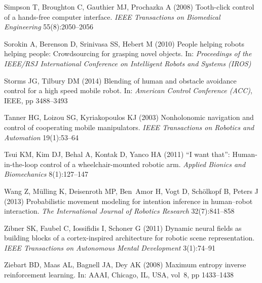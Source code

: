 \documentclass[natbib, twocolumn]{svjour3}          %
\begin{document}
\begin{thebibliography}{54}
	Simpson T, Broughton C, Gauthier MJ, Prochazka A (2008) Tooth-click control of
	a hands-free computer interface. \textit{IEEE Transactions on Biomedical
		Engineering} 55(8):2050--2056
	
	Sorokin A, Berenson D, Srinivasa SS, Hebert M (2010) People helping robots
	helping people: Crowdsourcing for grasping novel objects. In:
	\textit{Proceedings of the IEEE/RSJ International Conference on Intelligent
		Robots and Systems (IROS)}
	
	Storms JG, Tilbury DM (2014) Blending of human and obstacle avoidance control
	for a high speed mobile robot. In: \textit{American Control Conference
		(ACC)}, IEEE, pp 3488--3493
	
	Tanner HG, Loizou SG, Kyriakopoulos KJ (2003) Nonholonomic navigation and
	control of cooperating mobile manipulators. \textit{IEEE Transactions on
		Robotics and Automation} 19(1):53--64
	
	Tsui KM, Kim DJ, Behal A, Kontak D, Yanco HA (2011) “{I} want that”:
	Human-in-the-loop control of a wheelchair-mounted robotic arm.
	\textit{Applied Bionics and Biomechanics} 8(1):127--147
	
	Wang Z, M{\"u}lling K, Deisenroth MP, Ben~Amor H, Vogt D, Sch{\"o}lkopf B,
	Peters J (2013) Probabilistic movement modeling for intention inference in
	human--robot interaction. \textit{The International Journal of Robotics
		Research} 32(7):841--858
	
	Zibner SK, Faubel C, Iossifidis I, Schoner G (2011) Dynamic neural fields as
	building blocks of a cortex-inspired architecture for robotic scene
	representation. \textit{IEEE Transactions on Autonomous Mental Development}
	3(1):74--91
	
	Ziebart BD, Maas AL, Bagnell JA, Dey AK (2008) Maximum entropy inverse
	reinforcement learning. In: AAAI, Chicago, IL, USA, vol~8, pp 1433--1438
	
\end{thebibliography}
\end{document}
